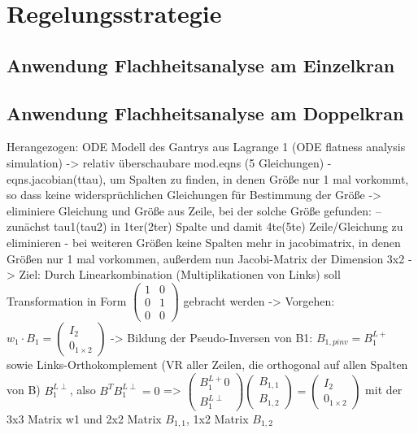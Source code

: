 \chapter{Regelungsstrategie}
\section{Anwendung Flachheitsanalyse am Einzelkran}

\section{Anwendung Flachheitsanalyse am Doppelkran}
Herangezogen: ODE Modell des Gantrys aus Lagrange 1 (ODE flatness analysis simulation)
-> relativ überschaubare mod.eqns (5 Gleichungen)
- eqns.jacobian(ttau), um Spalten zu finden, in denen Größe nur 1 mal vorkommt, so dass keine widersprüchlichen Gleichungen für Bestimmung der Größe 
-> eliminiere Gleichung und Größe aus Zeile, bei der solche Größe gefunden:
-- zunächst tau1(tau2) in 1ter(2ter) Spalte und damit 4te(5te) Zeile/Gleichung zu eliminieren
- bei weiteren Größen keine Spalten mehr in jacobimatrix, in denen Größen nur 1 mal vorkommen, außerdem nun Jacobi-Matrix der Dimension 3x2 
-> Ziel: Durch Linearkombination (Multiplikationen von Links) soll Transformation in Form $\left(\begin{matrix}
1 & 0\\
0 & 1\\
0 & 0
\end{matrix}\right)$ gebracht werden
-> Vorgehen: $w_1 \cdot B_1 = \left(\begin{matrix}
I_2 \\
0_{1 \times 2}
\end{matrix}\right)$ 
-> Bildung der Pseudo-Inversen von B1: $B_{1, pinv} = B_1^{L+}$ sowie Links-Orthokomplement (VR aller Zeilen, die orthogonal auf allen Spalten von B) $B_1^{L \perp}$, also $B^T B_1^{L \perp} = 0$
=> $\left(\begin{matrix}
B_1^{L+} 0 \\
B_1^{L \perp}
\end{matrix}\right)
\left(\begin{matrix}
B_{1, 1} \\
B_{1,2}
\end{matrix}\right)
=
\left(\begin{matrix}
I_2 \\
0_{1 \times 2}
\end{matrix}\right)
$
mit der 3x3 Matrix w1 und 2x2 Matrix $B_{1,1}$, 1x2 Matrix $B_{1,2}$
